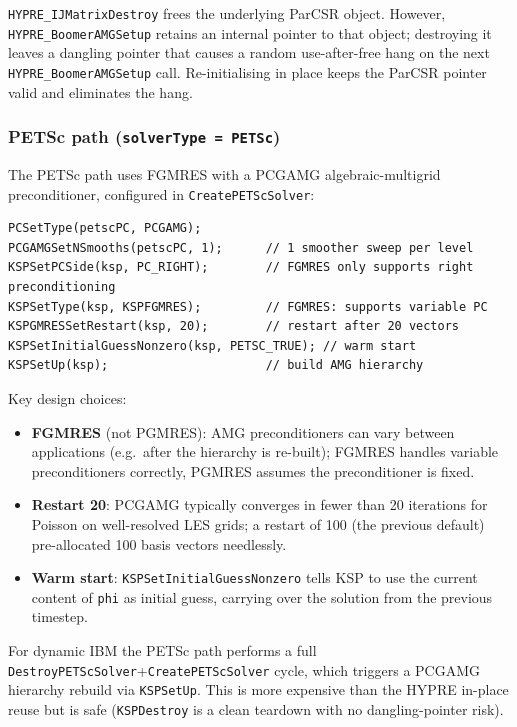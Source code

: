 \documentclass[12pt,a4paper]{article}
\begin{document}
\begin{warnbox}
\texttt{HYPRE\_IJMatrixDestroy} frees the underlying ParCSR object.
However, \texttt{HYPRE\_BoomerAMGSetup} retains an internal pointer to
that object; destroying it leaves a dangling pointer that causes a
random use-after-free hang on the next \texttt{HYPRE\_BoomerAMGSetup}
call.  Re-initialising in place keeps the ParCSR pointer valid and
eliminates the hang.
\end{warnbox}

\subsubsection{PETSc path (\texttt{solverType = PETSc})}

The PETSc path uses FGMRES with a PCGAMG algebraic-multigrid
preconditioner, configured in \texttt{CreatePETScSolver}:

\begin{lstlisting}[caption={PETSc solver configuration in \texttt{CreatePETScSolver}.}]
PCSetType(petscPC, PCGAMG);
PCGAMGSetNSmooths(petscPC, 1);      // 1 smoother sweep per level
KSPSetPCSide(ksp, PC_RIGHT);        // FGMRES only supports right preconditioning
KSPSetType(ksp, KSPFGMRES);         // FGMRES: supports variable PC
KSPGMRESSetRestart(ksp, 20);        // restart after 20 vectors
KSPSetInitialGuessNonzero(ksp, PETSC_TRUE); // warm start
KSPSetUp(ksp);                      // build AMG hierarchy
\end{lstlisting}

Key design choices:
\begin{itemize}
  \item \textbf{FGMRES} (not PGMRES): AMG preconditioners can vary
    between applications (e.g.\ after the hierarchy is re-built);
    FGMRES handles variable preconditioners correctly, PGMRES assumes
    the preconditioner is fixed.
  \item \textbf{Restart 20}: PCGAMG typically converges in fewer than
    20 iterations for Poisson on well-resolved LES grids; a restart of
    100 (the previous default) pre-allocated 100 basis vectors
    needlessly.
  \item \textbf{Warm start}: \texttt{KSPSetInitialGuessNonzero} tells
    KSP to use the current content of \texttt{phi} as initial guess,
    carrying over the solution from the previous timestep.
\end{itemize}

For dynamic IBM the PETSc path performs a full
\texttt{DestroyPETScSolver}+\texttt{CreatePETScSolver} cycle, which
triggers a PCGAMG hierarchy rebuild via \texttt{KSPSetUp}.  This is
more expensive than the HYPRE in-place reuse but is safe
(\texttt{KSPDestroy} is a clean teardown with no dangling-pointer risk).
\end{document}
